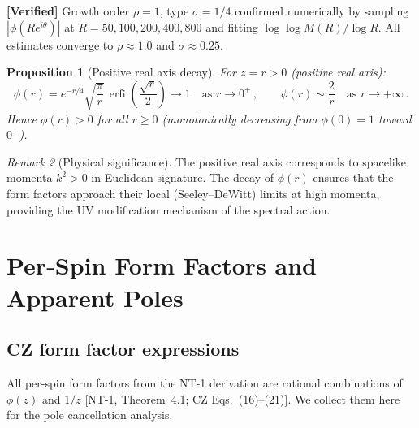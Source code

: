 \documentclass[12pt,a4paper]{article}
\newtheorem{proposition}{Proposition}[section]
\theoremstyle{definition}
\theoremstyle{remark}
\newtheorem{remark}[proposition]{Remark}
\newcommand{\erfi}{\operatorname{erfi}}
\newcommand{\fromlit}[1]{\textcolor{blue!70!black}{\textsf{[#1]}}}
\newcommand{\verified}[1]{%
  \par\smallskip\noindent
  \colorbox{green!10}{\parbox{\dimexpr\linewidth-2\fboxsep}{%
    \textcolor{green!50!black}{\textbf{[Verified]}} #1}}%
  \par\smallskip}
\begin{document}
\verified{Growth order $\rho=1$, type $\sigma=1/4$ confirmed
numerically by sampling $|\phi(Re^{i\theta})|$ at
$R=50,100,200,400,800$ and fitting $\log\log M(R)/\log R$.
All estimates converge to $\rho \approx 1.0$ and
$\sigma \approx 0.25$.}

\begin{proposition}[Positive real axis decay]
\label{prop:phi-pos-real}
For $z = r > 0$ (positive real axis):
\begin{equation}
  \phi(r) = e^{-r/4}\sqrt{\frac{\pi}{r}}\,\erfi\!\left(
    \frac{\sqrt{r}}{2}\right)
  \to 1\quad\text{as }r\to 0^+\,,
  \qquad
  \phi(r) \sim \frac{2}{r}\quad\text{as }r\to+\infty\,.
\end{equation}
Hence $\phi(r) > 0$ for all $r \geq 0$ (monotonically decreasing
from $\phi(0)=1$ toward $0^+$).
\end{proposition}

\begin{remark}[Physical significance]
The positive real axis corresponds to spacelike momenta
$k^2 > 0$ in Euclidean signature.  The decay of $\phi(r)$
ensures that the form factors approach their local
(Seeley--DeWitt) limits at high momenta, providing the UV
modification mechanism of the spectral action.
\end{remark}


\section{Per-Spin Form Factors and Apparent Poles}
\label{sec:form-factors}

\subsection{CZ form factor expressions}

All per-spin form factors from the NT-1 derivation are rational
combinations of $\phi(z)$ and $1/z$ \fromlit{NT-1, Theorem~4.1;
CZ Eqs.~(16)--(21)}.  We collect them here for the pole
cancellation analysis.
\end{document}
